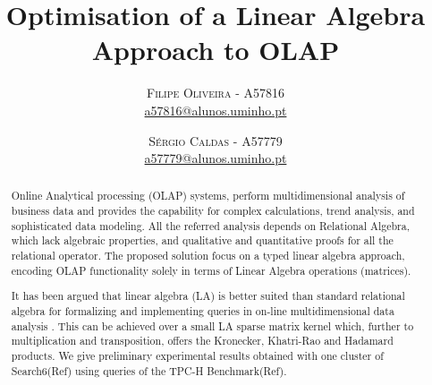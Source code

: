 \documentclass[twoside]{article}
\title{\vspace{-15mm}\fontsize{24pt}{10pt}\selectfont\textbf{Optimisation of a Linear Algebra Approach to OLAP}} %
\author{
\large
\textsc{Filipe Oliveira} - \textsc{A57816}\\
\normalsize \href{mailto:a57816@alunos.uminho.pt}{a57816@alunos.uminho.pt}
\vspace{-5mm}
\and
\textsc{Sérgio Caldas} - \textsc{A57779}\\
\normalsize \href{mailto:a57779@alunos.uminho.pt}{a57779@alunos.uminho.pt}
}
\begin{document}
\maketitle %

\thispagestyle{fancy} %


\begin{abstract}
\indent 
\par Online Analytical processing (OLAP) systems, perform multidimensional analysis of business data and provides the capability for complex calculations, trend analysis, and sophisticated data modeling. 
All the referred analysis depends on Relational Algebra, which lack algebraic properties, and qualitative and quantitative proofs for all the relational operator.
The proposed solution focus on a typed linear algebra approach, encoding OLAP functionality solely in terms of Linear Algebra operations (matrices).
\par It has been argued that linear algebra (LA) is better suited than standard relational algebra for formalizing and implementing queries in on-line multidimensional data analysis \cite{macedo2015linear} \cite{da2015benchmarking}. This can be achieved over a small LA sparse matrix kernel which, further to multiplication and transposition, offers the Kronecker, Khatri-Rao and Hadamard products.
We give preliminary experimental results obtained with one cluster of Search6(Ref) using queries of the TPC-H Benchmark(Ref).
\end{abstract}
\vspace{0.5cm}

\begin{multicols}{2} %


















\end{multicols}
\end{document}
